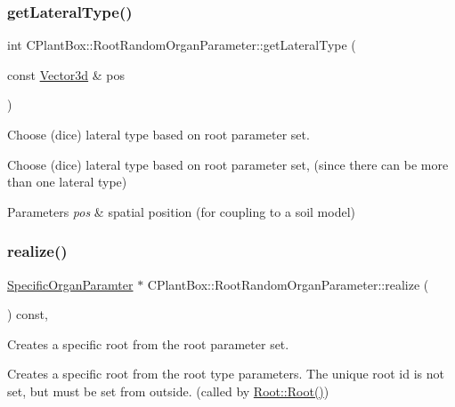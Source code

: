 \subsubsection{\texorpdfstring{get\+Lateral\+Type()}{getLateralType()}}
{\footnotesize\ttfamily int C\+Plant\+Box\+::\+Root\+Random\+Organ\+Parameter\+::get\+Lateral\+Type (\begin{DoxyParamCaption}\item[{const \hyperlink{classCPlantBox_1_1Vector3d}{Vector3d} \&}]{pos }\end{DoxyParamCaption})}



Choose (dice) lateral type based on root parameter set. 

Choose (dice) lateral type based on root parameter set, (since there can be more than one lateral type)


\begin{DoxyParams}{Parameters}
{\em pos} & spatial position (for coupling to a soil model) \\
\hline
\end{DoxyParams}
\mbox{\label{classCPlantBox_1_1RootRandomOrganParameter_a3da96f71d26370fea15a91114f3076f8}} 
\subsubsection{\texorpdfstring{realize()}{realize()}}
{\footnotesize\ttfamily \hyperlink{classCPlantBox_1_1SpecificOrganParamter}{Specific\+Organ\+Paramter} $\ast$ C\+Plant\+Box\+::\+Root\+Random\+Organ\+Parameter\+::realize (\begin{DoxyParamCaption}{ }\end{DoxyParamCaption}) const\hspace{0.3cm}{\ttfamily [override]}, {\ttfamily [virtual]}}



Creates a specific root from the root parameter set. 

Creates a specific root from the root type parameters. The unique root id is not set, but must be set from outside. (called by \hyperlink{classCPlantBox_1_1Root_a9192f7ecf7ee409e8089365175b53f25}{Root\+::\+Root()})

